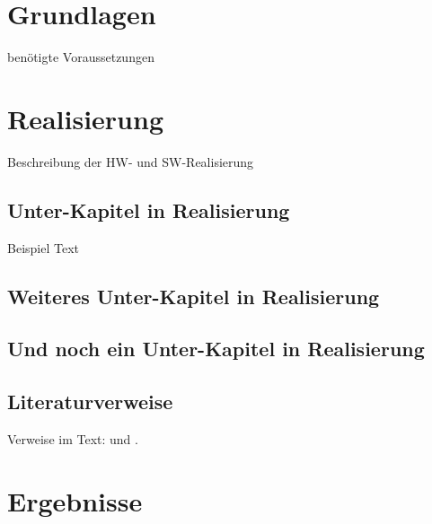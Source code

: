 
\chapter{Grundlagen}
\label{sec:grundl}
benötigte Voraussetzungen

\chapter{Realisierung}
\label{sec:real}
Beschreibung der HW- und SW-Realisierung

\section{Unter-Kapitel in Realisierung}
\label{sec:real-unter}
Beispiel Text


\newpage
\section{Weiteres Unter-Kapitel in Realisierung}
\label{sec:real-unterWeiter}

\newpage
\section{Und noch ein Unter-Kapitel in Realisierung}
\label{sec:real-unterWeiterNoch}

\section{Literaturverweise}
\label{sec:real-literatur}

Verweise im Text: \cite{doc:stz} und \cite{doc:gun}.

\chapter{Ergebnisse}
\label{sec:ergeb}


